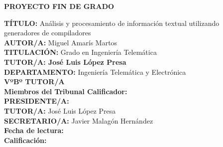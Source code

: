 \vspace{7cm}
\begin{center}
	{\fontsize{20}{24} \textbf{PROYECTO FIN DE GRADO} } \\
	
\end{center}
\vspace{1,5cm}
	\begin{adjustwidth}{3cm}{4cm}
		{\fontsize{11}{13,2} 
			{\textbf{TÍTULO:}  Análisis y procesamiento de información textual utilizando
				generadores de compiladores }\\[23pt]
			{\textbf{AUTOR/A:} Miguel Amarís Martos}\\[23pt]
			{\textbf{TITULACIÓN:} Grado en Ingeniería Telemática}\\[23pt]
			\textbf{{TUTOR/A:} José Luis López Presa}\\[23pt]
			{\textbf{DEPARTAMENTO:} Ingeniería Telemática y Electrónica}\\[23pt]
			\hspace*{\fill}	{\textbf{VºBº TUTOR/A}  }\\[23pt]
			{\textbf{Miembros del Tribunal Calificador:}}\\[23pt]
			{\textbf{PRESIDENTE/A:}}\\[23pt]
			{\textbf{TUTOR/A:} José Luis López Presa}\\[23pt]
			{\textbf{SECRETARIO/A:} Javier Malagón Hernández}\\[23pt]
			{\textbf{Fecha de lectura:}}\\[23pt]
			{\textbf{Calificación:} }\\[23pt]
			\\[23pt]
		}
	\end{adjustwidth}
	
\restoregeometry